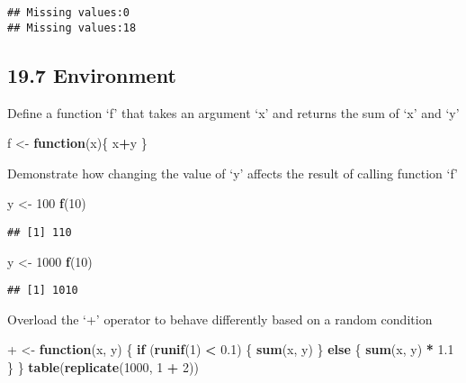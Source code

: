 \documentclass[
]{article}
\newenvironment{Shaded}{\begin{snugshade}}{\end{snugshade}}
\newcommand{\AttributeTok}[1]{\textcolor[rgb]{0.13,0.29,0.53}{#1}}
\newcommand{\ControlFlowTok}[1]{\textcolor[rgb]{0.13,0.29,0.53}{\textbf{#1}}}
\newcommand{\DecValTok}[1]{\textcolor[rgb]{0.00,0.00,0.81}{#1}}
\newcommand{\FloatTok}[1]{\textcolor[rgb]{0.00,0.00,0.81}{#1}}
\newcommand{\FunctionTok}[1]{\textcolor[rgb]{0.13,0.29,0.53}{\textbf{#1}}}
\newcommand{\NormalTok}[1]{#1}
\newcommand{\OtherTok}[1]{\textcolor[rgb]{0.56,0.35,0.01}{#1}}
\newcommand{\SpecialCharTok}[1]{\textcolor[rgb]{0.81,0.36,0.00}{\textbf{#1}}}
\newcommand{\StringTok}[1]{\textcolor[rgb]{0.31,0.60,0.02}{#1}}
\begin{document}
\begin{verbatim}
## Missing values:0
## Missing values:18
\end{verbatim}

\hypertarget{environment}{%
\subsection{19.7 Environment}\label{environment}}

Define a function `f' that takes an argument `x' and returns the sum of
`x' and `y'

\begin{Shaded}
\begin{Highlighting}[]
\NormalTok{f }\OtherTok{\textless{}{-}} \ControlFlowTok{function}\NormalTok{(x)\{}
\NormalTok{  x}\SpecialCharTok{+}\NormalTok{y}
\NormalTok{\}}
\end{Highlighting}
\end{Shaded}

Demonstrate how changing the value of `y' affects the result of calling
function `f'

\begin{Shaded}
\begin{Highlighting}[]
\NormalTok{y }\OtherTok{\textless{}{-}} \DecValTok{100}
\FunctionTok{f}\NormalTok{(}\DecValTok{10}\NormalTok{)}
\end{Highlighting}
\end{Shaded}

\begin{verbatim}
## [1] 110
\end{verbatim}

\begin{Shaded}
\begin{Highlighting}[]
\NormalTok{y }\OtherTok{\textless{}{-}} \DecValTok{1000}
\FunctionTok{f}\NormalTok{(}\DecValTok{10}\NormalTok{)}
\end{Highlighting}
\end{Shaded}

\begin{verbatim}
## [1] 1010
\end{verbatim}

Overload the `+' operator to behave differently based on a random
condition

\begin{Shaded}
\begin{Highlighting}[]
\StringTok{\textasciigrave{}}\AttributeTok{+}\StringTok{\textasciigrave{}} \OtherTok{\textless{}{-}} \ControlFlowTok{function}\NormalTok{(x, y) \{}
  \ControlFlowTok{if}\NormalTok{ (}\FunctionTok{runif}\NormalTok{(}\DecValTok{1}\NormalTok{) }\SpecialCharTok{\textless{}} \FloatTok{0.1}\NormalTok{) \{}
    \FunctionTok{sum}\NormalTok{(x, y)}
\NormalTok{  \} }\ControlFlowTok{else}\NormalTok{ \{}
    \FunctionTok{sum}\NormalTok{(x, y) }\SpecialCharTok{*} \FloatTok{1.1}
\NormalTok{  \}}
\NormalTok{\}}
\FunctionTok{table}\NormalTok{(}\FunctionTok{replicate}\NormalTok{(}\DecValTok{1000}\NormalTok{, }\DecValTok{1} \SpecialCharTok{+} \DecValTok{2}\NormalTok{))}
\end{Highlighting}
\end{Shaded}
\end{document}

